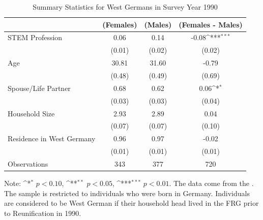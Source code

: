 \documentclass[a4paper, oneside, hyperfootnotes = false]{article}
\def\sym#1{\ifmmode^{#1}\else\(^{#1}\)\fi}
\begin{document}
{\begin{table}[ht]
    \caption{Summary Statistics for West Germans in Survey Year 1990}
    \label{tab:descr_summary_west}
    \begin{center}
        \begin{tabular}{l*{3}{c}}
        	\toprule
        	& (Females) & (Males) & (Females - Males) \\
        	\midrule
        	STEM Profession & 0.06  & 0.14 &  -0.08\sym{***}      \\
        	&   (0.01)  & (0.02) & (0.02) \\
        	\addlinespace
        	Age         & 30.81     &  31.60   &    -0.79     \\
        	&     (0.48) &        (0.49)         &      (0.69) \\
        	\addlinespace
        	Spouse/Life Partner & 0.68       &  0.62   &     0.06\sym{*}      \\
        	&      (0.03)&          (0.03)&         (0.04) \\
        	\addlinespace
        	Household Size      &  2.93   &  2.89   &    0.04       \\
        	&          (0.07)&       (0.07)        &      (0.10)\\
        	\addlinespace
        	Residence in West Germany& 0.96    &  0.97   &    -0.02        \\
        	&         (0.01) &       (0.01)&  (0.01)\\
        	\midrule
        	Observations        &        343 &     377     &       720                \\
        	\bottomrule
        \end{tabular}
        
        \vspace{2mm}
        
        \parbox{10cm}{
        \linespread{1}\footnotesize Note: \sym{*} \(p<0.10\), \sym{**} \(p<0.05\), \sym{***} \(p<0.01\). The data come from the \cite{SOEP2023}. The sample is restricted to individuals who were born in Germany. Individuals are considered to be West German if their household head lived in the FRG prior to Reunification in 1990.}
        
    \end{center}
\end{table}

}
\end{document}
